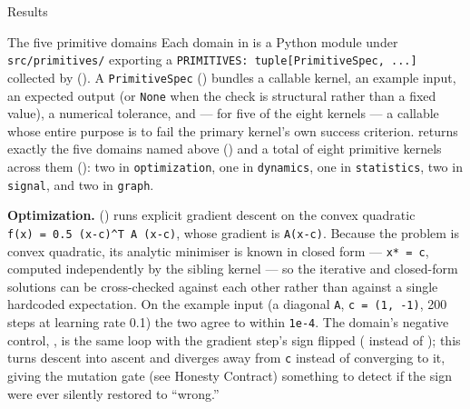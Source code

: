 \documentclass[
  ignorenonframetext,
]{beamer}
\begin{document}
\begin{frame}{Results}
\begin{block}{The five primitive domains}
Each domain in
is a Python module under \texttt{src/primitives/} exporting a
\texttt{PRIMITIVES:\ tuple{[}PrimitiveSpec,\ ...{]}} collected by
(). A \texttt{PrimitiveSpec}
() bundles a callable kernel, an example
input, an expected output (or \texttt{None} when the check is structural
rather than a fixed value), a numerical tolerance, and --- for five of
the eight kernels --- a  callable whose entire
purpose is to fail the primary kernel's own success criterion.
 returns exactly the five domains named
above () and a
total of eight primitive kernels across them
(): two in \texttt{optimization},
one in \texttt{dynamics}, one in \texttt{statistics}, two in
\texttt{signal}, and two in \texttt{graph}.

\textbf{Optimization.} 
() runs explicit gradient descent
on the convex quadratic \texttt{f(x)\ =\ 0.5\ (x-c)\^{}T\ A\ (x-c)},
whose gradient is \texttt{A(x-c)}. Because the problem is convex
quadratic, its analytic minimiser is known in closed form ---
\texttt{x*\ =\ c}, computed independently by the sibling kernel
 --- so the iterative and closed-form
solutions can be cross-checked against each other rather than against a
single hardcoded expectation. On the example input (a diagonal
\texttt{A}, \texttt{c\ =\ (1,\ -1)}, 200 steps at learning rate 0.1) the
two agree to within \texttt{1e-4}. The domain's negative control,
, is the same loop with the
gradient step's sign flipped ( instead
of ); this turns descent into ascent and
diverges away from \texttt{c} instead of converging to it, giving the
mutation gate (see Honesty Contract) something to detect if the sign
were ever silently restored to ``wrong.''


\end{block}
\end{frame}
\end{document}
